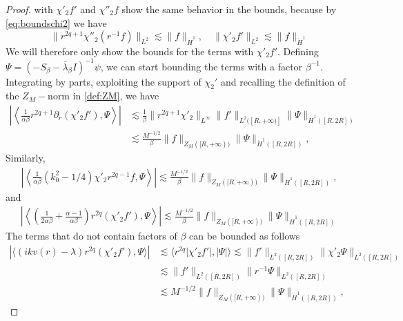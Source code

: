 \documentclass[10pt,a4paper]{amsart}
\def\HH {\dot{H}^1}
\def\de{{\partial}}
\begin{document}
\begin{proof}
with $\chi'_2 f'$ and $\chi''_2 f$ show the same behavior in the bounds, because by \cref{eq:boundschi2} we have
\begin{equation}
\|r^{2q+1}\chi''_2  (r^{-1}f)\|_{L^2} \lesssim \|f\|_{\HH}, \quad \|\chi'_2 f'\|_{L^2} \lesssim \|f\|_{\HH} 
\end{equation}
We will therefore only show the bounds for the terms with $\chi'_2 f'$. Defining $\Psi = (-S_\beta-\bar\lambda_\beta I)^{-1} \psi$, we can start bounding the terms with a factor $\beta^{-1}$. Integrating by parts, exploiting the support of $\chi_2'$ and recalling the definition of the $Z_M-$norm in \cref{def:ZM}, we have
\begin{align}
    \left| \left\langle \frac{1}{\alpha \beta} r^{2q+1}\de_r (\chi'_2 f'), \Psi \right\rangle\right| & \lesssim \frac{1}{\beta} \|r^{2q+1}\chi'_2\|_{L^\infty} \|f' \|_{L^2([R,+\infty)]}\|\Psi\|_{\dot{H}^1([R,2R])} \\ & \lesssim \frac{ M^{-1/2}}{\beta}  \|f \|_{Z_M([R,+\infty))} \|\Psi\|_{\HH([R,2R])},\label{eq:boundbeta1}
\end{align}
Similarly,
\begin{align}
\left|\left\langle \frac{1}{\alpha \beta} (k_{0}^2-1/4) \chi'_2 r^{2q-1} f, \Psi \right\rangle\right| 
    \lesssim \frac{M^{-1/2}}{\beta} \|f\|_{Z_M([R,+\infty))} \|\Psi\|_{\HH([R,2R])},\label{eq:boundbeta2}
\end{align}
and 
\begin{align}
    \left| \left\langle \left(\frac{1}{2\alpha \beta} + \frac{\alpha -1}{\alpha\beta}\right) r^{2q}(\chi'_2 f'), \Psi \right\rangle\right| \lesssim \frac{M^{-1/2}}{\beta} \|f\|_{Z_M([R,+\infty))} \|\Psi\|_{\HH([R,2R])}
\label{eq:boundbeta3}
\end{align}
The terms that do not contain factors of $\beta$ can be bounded as follows
\begin{align}
|\langle (ikv(r) - \lambda) r^{2q}(\chi'_2 f'), \Psi\rangle| & \lesssim \langle r^{2q}|\chi'_2 f'|, |\Psi| \rangle   \lesssim \|f'\|_{L^2([R,2R])} \|\chi'_2 \Psi\|_{L^2([R,2R])} \\ & \lesssim \|f'\|_{L^2([R,2R])} \|r^{-1} \Psi\|_{L^2([R,2R])}  \\ & \lesssim M^{-1/2} \|f\|_{Z_M([R,+\infty))} \|\Psi\|_{\HH([R,2R])},

\end{align}
\end{proof}
\end{document}
